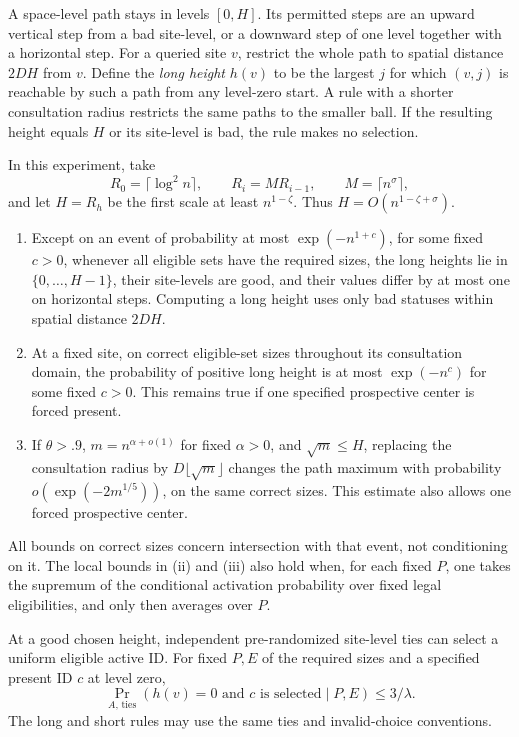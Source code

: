 A space-level path stays in levels \([0,H]\). Its permitted steps are an
upward vertical step from a bad site-level, or a downward step of one
level together with a horizontal step. For a queried site \(v\), restrict
the whole path to spatial distance \(2DH\) from \(v\). Define the
\emph{long height} \(h(v)\) to be the largest \(j\) for which \((v,j)\)
is reachable by such a path from any level-zero start. A rule with a
shorter consultation radius restricts the same paths to the smaller ball.
If the resulting height equals \(H\) or its site-level is bad, the rule
makes no selection.

\begin{lemma}\label{lem:height-selection}
In this experiment, take
\[
 R_0=\lceil\log^2 n\rceil,\qquad
 R_i=MR_{i-1},\qquad M=\lceil n^\sigma\rceil,
\]
and let \(H=R_h\) be the first scale at least \(n^{1-\zeta}\). Thus
\(H=O(n^{1-\zeta+\sigma})\).
\begin{enumerate}[label=(\roman*),leftmargin=*]
\item Except on an event of probability at most \(\exp(-n^{1+c})\), for
some fixed \(c>0\), whenever all eligible sets have the required sizes,
the long heights lie in \(\{0,\ldots,H-1\}\), their site-levels are good,
and their values differ by at most one on horizontal steps. Computing a
long height uses only bad statuses within spatial distance \(2DH\).
\item At a fixed site, on correct eligible-set sizes throughout its
consultation domain, the probability of positive long height is at most
\(\exp(-n^c)\) for some fixed \(c>0\). This remains true if one specified
prospective center is forced present.
\item If \(\theta>.9\), \(m=n^{\alpha+o(1)}\) for fixed \(\alpha>0\), and
\(\sqrt m\le H\), replacing the consultation radius by
\(D\lfloor\sqrt m\rfloor\) changes the path maximum with probability
\(o(\exp(-2m^{1/5}))\), on the same correct sizes. This estimate also
allows one forced prospective center.
\end{enumerate}
All bounds on correct sizes concern intersection with that event, not
conditioning on it. The local bounds in (ii) and (iii) also hold when,
for each fixed \(P\), one takes the supremum of the conditional activation
probability over fixed legal eligibilities, and only then averages over
\(P\).

At a good chosen height, independent pre-randomized site-level ties can
select a uniform eligible active ID. For fixed \(P,E\) of the required
sizes and a specified present ID \(c\) at level zero,
\[
 \Pr_{A,\,\mathrm{ties}}(h(v)=0\text{ and }c\text{ is selected}\mid P,E)
 \le 3/\lambda.
\]
The long and short rules may use the same ties and invalid-choice
conventions.
\end{lemma}

